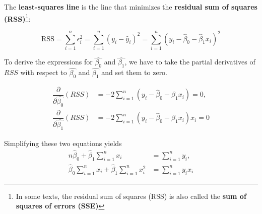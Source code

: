 \documentclass[twoside]{book}
\begin{document}
\begin{center}
\end{center}

The \textbf{least-squares line} is the line that minimizes the \textbf{residual sum of squares (RSS)}\footnote{In some texts, the residual sum of squares (RSS) is also called the \textbf{sum of squares of errors (SSE)}}:

\begin{textbox}
\[
\text{RSS} = \sum_{i=1}^{n} \epsilon_i^2 = \sum_{i=1}^{n} (y_i - \hat{y}_i)^2 = \sum_{i=1}^{n} (y_i - \hat{\beta}_0 - \hat{\beta}_1 x_i)^2
\]
\end{textbox}

To derive the expressions for $\hat{\beta_0}$ and $\hat{\beta_1}$, we have to take the partial derivatives of $RSS$ with respect to $\hat{\beta_0}$ and $\hat{\beta_1}$ and set them to zero.

\begin{align*}
    \dfrac{\partial}{\partial \hat{\beta_0}} (RSS) &=-2\sum_{i=1}^{n} (y_i - \hat{\beta}_0 - \hat{\beta}_1 x_i) = 0,\\ \dfrac{\partial}{\partial \hat{\beta_1}} (RSS) &= -2\sum_{i=1}^{n} (y_i - \hat{\beta}_0 - \hat{\beta}_1 x_i)x_i = 0
\end{align*}

Simplifying these two equations yields
\begin{align*}
 n\hat{\beta}_0 + \hat{\beta}_1 \sum_{i=1}^{n}x_i &= \sum_{i=1}^{n} y_i, \\
\hat{\beta}_0\sum_{i=1}^{n}  x_i + \hat{\beta}_1 \sum_{i=1}^{n}x_i^2 &= \sum_{i=1}^{n} y_i x_i
\end{align*}
\end{document}
